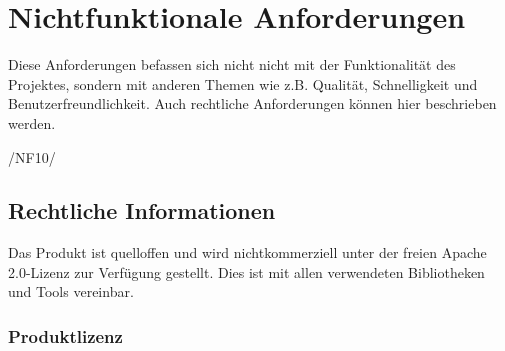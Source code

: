 \section{Nichtfunktionale Anforderungen}
Diese Anforderungen befassen sich nicht nicht mit der Funktionalität des Projektes, sondern mit anderen Themen wie z.B. Qualität, Schnelligkeit und Benutzerfreundlichkeit. Auch rechtliche Anforderungen können hier beschrieben werden.

\begin{description}
     \item /NF10/ 
\end{description}

\subsection{Rechtliche Informationen}
Das Produkt ist quelloffen und wird nichtkommerziell unter der freien Apache 2.0-Lizenz zur Verfügung gestellt. Dies ist mit allen verwendeten Bibliotheken und Tools vereinbar.

\subsubsection{Produktlizenz}
